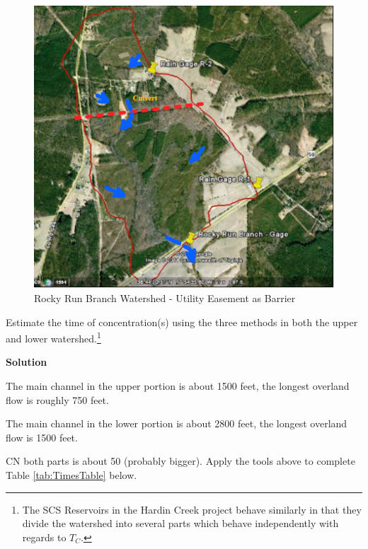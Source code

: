 \documentclass[12pt]{article}
\begin{document}
\begin{enumerate}
\begin{figure}[h!] %
   \centering
   \includegraphics[width=5.0in]{RockyRunSubDivide.jpg} 
   \caption{Rocky Run Branch Watershed - Utility Easement as Barrier}
   \label{fig:RockyRunSubDivide}
\end{figure}

Estimate the time of concentration(s) using the three methods in both the upper and lower watershed.\footnote{The SCS Reservoirs in the Hardin Creek project behave similarly in that they divide the watershed into several parts which behave independently with regards to $T_C$.}

\textbf{Solution}

The main channel in the upper portion is about 1500 feet, the longest overland flow is roughly 750 feet.

The main channel in the lower portion is about 2800 feet, the longest overland flow is 1500 feet.

CN both parts is about 50 (probably bigger).  Apply the tools above to complete Table \ref{tab:TimesTable} below.


\end{enumerate}
\end{document}
